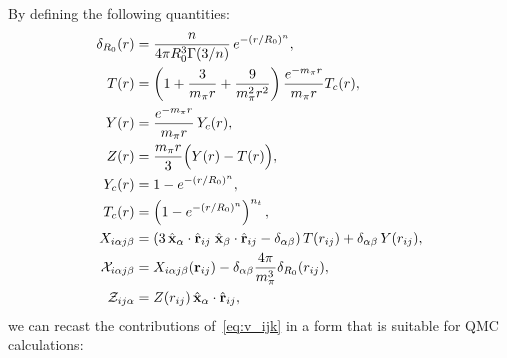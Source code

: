 \documentclass[aps,prc,twocolumn,superscriptaddress,showpacs,floatfix,nofootinbib]{revtex4-1}
\begin{document}
By defining the following quantities:
\begin{align}
\delta_{R_0}(r)&=\frac{n}{4\pi R_0^3\Gamma(3/n)}\,e^{-(r/R_0)^n}
\nonumber, \\
T(r)&=\left(1+\frac{3}{m_\pi r}+\frac{9}{m_\pi^2r^2}\right)\frac{e^{-m_\pi r}}{m_\pi r} T_c(r)
\nonumber, \\
Y(r)&=\frac{e^{-m_\pi r}}{m_\pi r}\,Y_c(r) 
\nonumber, \\
Z(r)&=\frac{m_\pi r}{3}\Big(Y(r)-T(r)\Big)
\nonumber, \\
Y_c(r)&=1-e^{-(r/R_0)^n}
\nonumber, \\
T_c(r)&=\left(1-e^{-(r/R_0)^n}\right)^{n_t}
\nonumber, \\
X_{i\alpha j\beta}&=(3\,\hat{\vb{x}}_\alpha\cdot\hat{\vb{r}}_{ij}\;\hat{\vb{x}}_\beta\cdot\hat{\vb{r}}_{ij}-\delta_{\alpha\beta})\,T(r_{ij})
+\delta_{\alpha\beta}\,Y(r_{ij}) 
\nonumber, \\
{\cal X}_{i\alpha j\beta}&=X_{i\alpha j\beta}(\vb{r}_{ij})-\delta_{\alpha\beta}\frac{4\pi}{m_\pi^3}\delta_{R_0}(r_{ij})
\nonumber, \\
{\cal Z}_{ij\alpha}&=Z(r_{ij})\,\hat{\vb{x}}_\alpha\cdot\hat{\vb{r}}_{ij},
\end{align}
we can recast the contributions of~\cref{eq:v_ijk} in a form that is suitable for QMC calculations:
\end{document}
